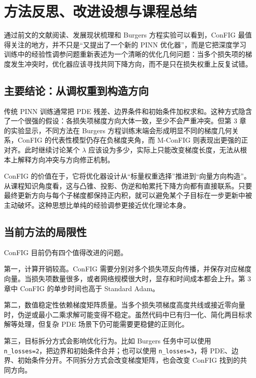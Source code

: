 \documentclass[UTF8,a4paper,12pt,fontset=none]{ctexart}
\begin{document}
\section{方法反思、改进设想与课程总结}

通过前文的文献阅读、发展现状梳理和 Burgers 方程实验可以看到，ConFIG 最值得关注的地方，并不只是“又提出了一个新的 PINN 优化器”，而是它把深度学习训练中的经验性调参问题重新表述为一个清晰的优化几何问题：当多个损失项的梯度发生冲突时，优化器应该寻找共同下降方向，而不是只在损失权重上反复试错。


\subsection{主要结论：从调权重到构造方向}

传统 PINN 训练通常把 PDE 残差、边界条件和初始条件加权求和。这种方式隐含了一个很强的假设：各损失项梯度方向大体一致，至少不会严重冲突。但第 3 章的实验显示，不同方法在 Burgers 方程训练末端会形成明显不同的梯度几何关系，ConFIG 的代表性模型仍存在负梯度夹角，而 M-ConFIG 则表现出更强的正对齐。此时继续讨论某个 $\lambda$ 应该设为多少，实际上只能改变梯度长度，无法从根本上解释方向冲突与方向修正机制。


ConFIG 的价值在于，它将优化器设计从“标量权重选择”推进到“向量方向构造”。从课程知识角度看，这与凸锥、投影、伪逆和帕累托下降方向都有直接联系。只要最终更新方向与每个子梯度都保持正内积，就可以避免某个子目标在一步更新中被主动破坏。这种思想比单纯的经验调参更接近优化理论本身。


\subsection{当前方法的局限性}

ConFIG 目前仍有四个值得改进的问题。


第一，计算开销较高。ConFIG 需要分别对多个损失项反向传播，并保存对应梯度向量。当损失项数量很多，或者网络规模很大时，显存和时间成本都会上升。第 3 章中 ConFIG 的单步时间也高于 Standard Adam。


第二，数值稳定性依赖梯度矩阵质量。当多个损失项梯度高度共线或接近零向量时，伪逆或最小二乘求解可能变得不稳定。虽然代码中已有归一化、简化两目标求解等处理，但复杂 PDE 场景下仍可能需要更稳健的正则化。


第三，目标拆分方式会影响优化行为。比如 Burgers 任务中可以使用 \texttt{n\_losses=2}，把边界和初始条件合并；也可以使用 \texttt{n\_losses=3}，将 PDE、边界、初始条件分开。不同拆分方式会改变梯度矩阵，也会改变 ConFIG 找到的共同方向。
\end{document}

